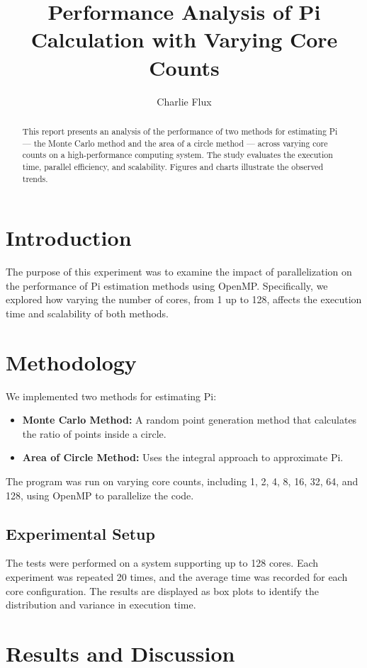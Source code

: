 \documentclass[conference]{IEEEtran}
\title{Performance Analysis of Pi Calculation with Varying Core Counts}
\author{Charlie Flux}
\begin{document}
\maketitle

\begin{abstract}
This report presents an analysis of the performance of two methods for estimating Pi --- the Monte Carlo method and the area of a circle method --- across varying core counts on a high-performance computing system. The study evaluates the execution time, parallel efficiency, and scalability. Figures and charts illustrate the observed trends.
\end{abstract}

\section{Introduction}
The purpose of this experiment was to examine the impact of parallelization on the performance of Pi estimation methods using OpenMP. Specifically, we explored how varying the number of cores, from 1 up to 128, affects the execution time and scalability of both methods.

\section{Methodology}
We implemented two methods for estimating Pi:
\begin{itemize}
    \item \textbf{Monte Carlo Method:} A random point generation method that calculates the ratio of points inside a circle.
    \item \textbf{Area of Circle Method:} Uses the integral approach to approximate Pi.
\end{itemize}
The program was run on varying core counts, including 1, 2, 4, 8, 16, 32, 64, and 128, using OpenMP to parallelize the code.

\subsection{Experimental Setup}
The tests were performed on a system supporting up to 128 cores. Each experiment was repeated 20 times, and the average time was recorded for each core configuration. The results are displayed as box plots to identify the distribution and variance in execution time.

\section{Results and Discussion}
\end{document}

